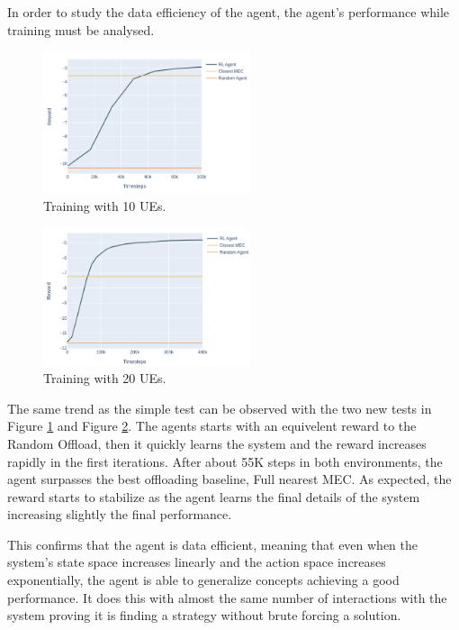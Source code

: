 In order to study the data efficiency of the agent, the agent's performance while training must be analysed.


\begin{minipage}{0.5\textwidth}
\begin{figure}[H]
  \centering
  \includegraphics[width=230px]{images/5_10_training.png}
  \caption{Training with 10 \acrshort{UE}s.}  \label{5_10_training}
\end{figure}
\end{minipage}
\begin{minipage}{0.5\textwidth}
\begin{figure}[H]
  \centering
  \includegraphics[width=230px]{images/5_20_training.png}
  \caption{Training with 20 \acrshort{UE}s.}  \label{5_20_training}
\end{figure}
\end{minipage}

\hfill \break
The same trend as the simple test can be observed with the two new tests in Figure \ref{5_10_training} and Figure \ref{5_20_training}. The agents starts with an equivelent reward to the Random Offload, then it quickly learns the system and the reward increases rapidly in the first iterations. After about 55K steps in both environments, the agent surpasses the best offloading baseline, Full nearest MEC. As expected, the reward starts to stabilize as the agent learns the final details of the system increasing slightly the final performance.

This confirms that the agent is data efficient, meaning that even when the system's state space increases linearly and the action space increases exponentially, the agent is able to generalize concepts achieving a good performance. It does this with almost the same number of interactions with the system proving it is finding a strategy without brute forcing a solution.

